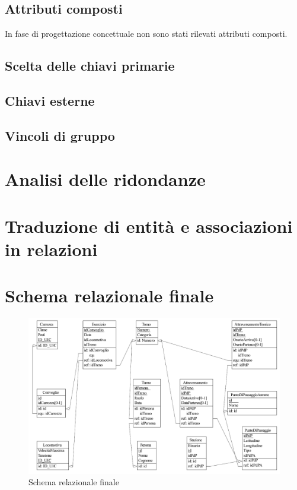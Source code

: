 \documentclass[a4paper,12pt]{report}
\begin{document}
	\subsection{Attributi composti}
	\par In fase di progettazione concettuale non sono stati rilevati attributi composti.
	\subsection{Scelta delle chiavi primarie}
	\subsection{Chiavi esterne}
	\subsection{Vincoli di gruppo}
	\section{Analisi delle ridondanze}
	\section{Traduzione di entità e associazioni in relazioni}
	
	\section{Schema relazionale finale}
	\begin{figure}[h!]
		\begin{center}
			\includegraphics[width=\linewidth]{res/schema/logico}
		\end{center}
		\caption{Schema relazionale finale}
	\end{figure}
\end{document}
